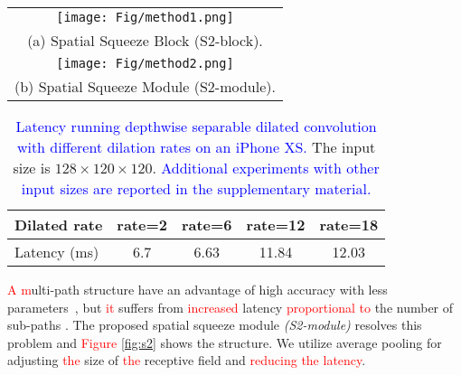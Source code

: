 \documentclass[10pt,twocolumn,letterpaper]{article}
\newcommand\Lars[1]{\textcolor{blue}{#1}}
\newcommand\nj[1]{\textcolor{red}{#1}}
\newcommand\Lars[1]{#1}
\newcommand\nj[1]{#1}
\begin{document}
\begin{figure*}[t]
\begin{center}
\begin{tabular}{c}
    \texttt{[image: Fig/method1.png]} \\ 
    (a) Spatial Squeeze Block (S2-block).     \\

        \texttt{[image: Fig/method2.png]} \\ 
    (b) Spatial Squeeze Module (S2-module).  \\
        \end{tabular}\end{center}
   \caption{(a) An input feature map is squeezed by \Lars{an} $N \times N$ average pooling before a depthwise convolution. Then, a bilinear upsampling recovers \Lars{the original input} resolution of \Lars{the} feature map\Lars{s}. (b) \Lars{The} S2-module has multi-receptive structures by \Lars{using} different combination\Lars{s} of convolution kernel\Lars{s} and pooling for \Lars{the} S2-block\Lars{s}.}
\label{fig:s2}
\vspace{-2mm}
\end{figure*}

\begin{table}[t]
\begin{center}

    \begin{tabular}{l | c c c c}
     \hline
     Dilated rate & rate=2 & rate=6 & rate=12 & rate=18 \\
     \hline \hline
     Latency (ms) & 6.7  & 6.63 & 11.84 & 12.03 \\
     \hline
    \end{tabular}\end{center}
      \caption{\Lars{Latency running depthwise separable dilated convolution with different dilation rates on an iPhone XS.} The input size is $128\times120\times120$.  \Lars{Additional experiments with other input sizes are reported in the supplementary material.}}\label{tab:dilation_time}\end{table}

\nj{A m}ulti-path structure have an advantage of high accuracy with less parameters~\cite{wang2019elastic, szegedy2017inception, szegedy2017inception, xie2017aggregated}, but \nj{it} suffers from \nj{increased} latency \nj{proportional to} the number of sub-paths \cite{ma2018shufflenet}.
The proposed spatial squeeze module \textit{(S2-module)} resolves this problem and \nj{Figure} \ref{fig:s2} shows the structure.
We utilize average pooling for adjusting \nj{the} size of \nj{the} receptive field and \nj{reducing the latency}.
\end{document}
